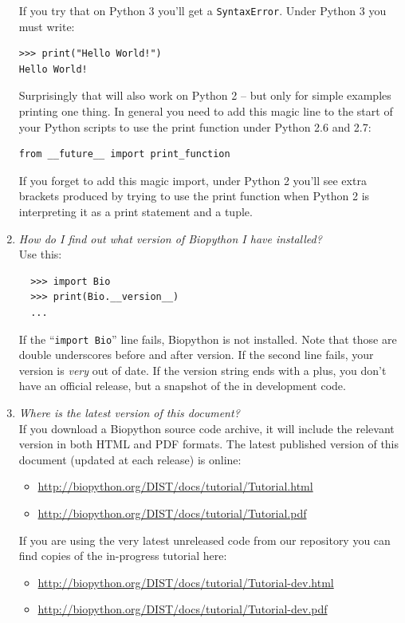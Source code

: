 \documentclass{report}
\begin{document}
\begin{enumerate}
  If you try that on Python 3 you'll get a \verb|SyntaxError|.
  Under Python 3 you must write:

\begin{verbatim}
>>> print("Hello World!")
Hello World!
\end{verbatim}

  Surprisingly that will also work on Python 2 -- but only for simple
  examples printing one thing. In general you need to add this magic
  line to the start of your Python scripts to use the print function
  under Python 2.6 and 2.7:

\begin{verbatim}
from __future__ import print_function
\end{verbatim}

  If you forget to add this magic import, under Python 2 you'll see
  extra brackets produced by trying to use the print function when
  Python 2 is interpreting it as a print statement and a tuple.

  \item \emph{How do I find out what version of Biopython I have installed?} \\
  Use this:
  \begin{verbatim}
  >>> import Bio
  >>> print(Bio.__version__)
  ...
  \end{verbatim}
  If the ``\verb|import Bio|'' line fails, Biopython is not installed.
  Note that those are double underscores before and after version.
  If the second line fails, your version is \emph{very} out of date.
  If the version string ends with a plus, you don't have an official
  release, but a snapshot of the in development code. 

  \item \emph{Where is the latest version of this document?}\\
  If you download a Biopython source code archive, it will include the
  relevant version in both HTML and PDF formats.  The latest published
  version of this document (updated at each release) is online:
  \begin{itemize}
  \item \url{http://biopython.org/DIST/docs/tutorial/Tutorial.html}
  \item \url{http://biopython.org/DIST/docs/tutorial/Tutorial.pdf}
  \end{itemize}
  If you are using the very latest unreleased code from our repository
  you can find copies of the in-progress tutorial here:
  \begin{itemize}
  \item \url{http://biopython.org/DIST/docs/tutorial/Tutorial-dev.html}
  \item \url{http://biopython.org/DIST/docs/tutorial/Tutorial-dev.pdf}
  \end{itemize}
  

\end{enumerate}
\end{document}
